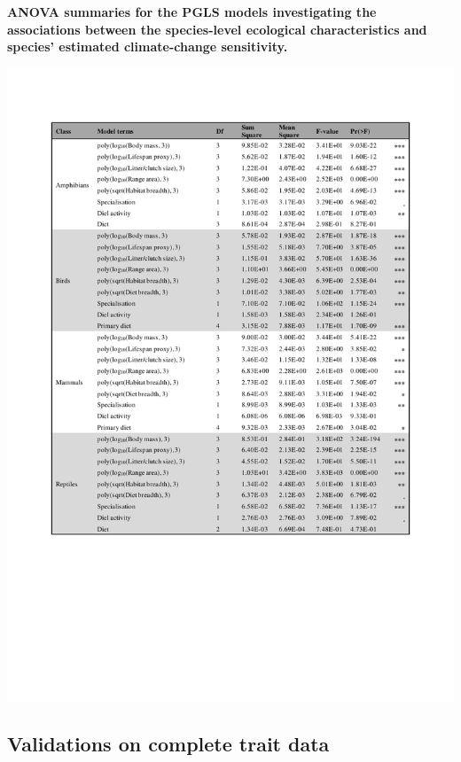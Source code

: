 \begin{table}[h!]
\centering
\caption[ANOVA summaries for the PGLS models investigating the associations between the species-level ecological characteristics and species' estimated climate-change sensitivity.]{\textbf{ANOVA summaries for the PGLS models investigating the associations between the species-level ecological characteristics and species' estimated climate-change sensitivity.}}
\includegraphics[scale=1, trim={2cm 5 1 2.5cm}, clip]{figures/Chapter4/Table_ANOVA_PGLS_pdf}
\label{chap4_table2}
\end{table}

\clearpage

\subsection{Validations on complete trait data}

